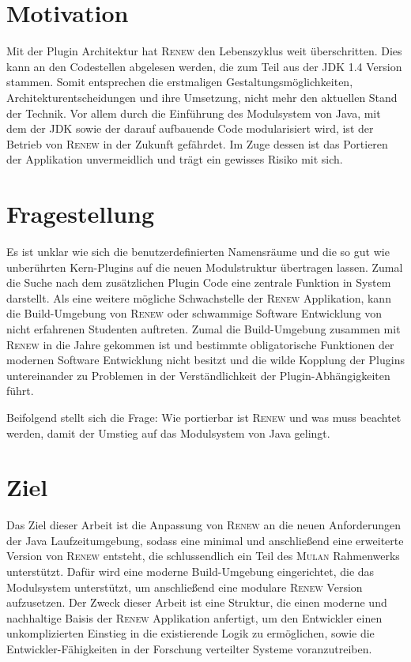 \section{Motivation} \label{sec:motivation}
	Mit der Plugin Architektur hat \textsc{Renew} den Lebenszyklus weit überschritten. Dies kann an den Codestellen abgelesen werden, die zum Teil aus der JDK 1.4 Version stammen. Somit entsprechen die erstmaligen Gestaltungsmöglichkeiten, Architekturentscheidungen und ihre Umsetzung, nicht mehr den aktuellen Stand der Technik. Vor allem durch die Einführung des Modulsystem von Java, mit dem der JDK sowie der darauf aufbauende Code modularisiert wird, ist der Betrieb von \textsc{Renew} in der Zukunft gefährdet. Im Zuge dessen ist das Portieren der Applikation unvermeidlich und trägt ein gewisses Risiko mit sich.

\section{Fragestellung} \label{sec:KdS}
	Es ist unklar wie sich die benutzerdefinierten Namensräume und die so gut wie unberührten Kern-Plugins auf die neuen Modulstruktur übertragen lassen. Zumal die Suche nach dem zusätzlichen Plugin Code eine zentrale Funktion in System darstellt.\newline
	Als eine weitere mögliche Schwachstelle der \textsc{Renew} Applikation, kann die Build-Umgebung von \textsc{Renew} oder schwammige Software Entwicklung von nicht erfahrenen Studenten auftreten. Zumal die Build-Umgebung zusammen mit \textsc{Renew} in die Jahre gekommen ist und bestimmte obligatorische Funktionen der modernen Software Entwicklung nicht besitzt und die wilde Kopplung der Plugins untereinander zu Problemen in der Verständlichkeit der Plugin-Abhängigkeiten führt.\bigbreak

	Beifolgend stellt sich die Frage: Wie portierbar ist \textsc{Renew} und was muss beachtet werden, damit der Umstieg auf das Modulsystem von Java gelingt.

\section{Ziel} \label{sec:Z}

	Das Ziel dieser Arbeit ist die Anpassung von \textsc{Renew} an die neuen Anforderungen der Java Laufzeitumgebung, sodass eine minimal und anschließend eine erweiterte Version von \textsc{Renew} entsteht, die schlussendlich ein Teil des \textsc{Mulan} Rahmenwerks unterstützt. Dafür wird eine moderne Build-Umgebung eingerichtet, die das Modulsystem unterstützt, um anschließend eine modulare \textsc{Renew} Version aufzusetzen. 
	Der Zweck dieser Arbeit ist eine Struktur, die einen moderne und nachhaltige Baisis der \textsc{Renew} Applikation anfertigt, um den Entwickler einen unkomplizierten Einstieg in die existierende Logik zu ermöglichen, sowie die Entwickler-Fähigkeiten in der Forschung verteilter Systeme voranzutreiben.\bigbreak

